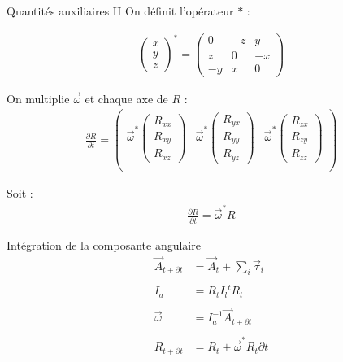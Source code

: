 \documentclass{beamer}
\newcommand{\deriv}{\partial \!}
\begin{document}
\begin{frame}{Quantités auxiliaires II}
  On définit l'opérateur $*$ :

  \begin{align*}
    \begin{pmatrix}
      x \\ y \\ z
    \end{pmatrix}
    ^*
    =
    \begin{pmatrix}
      0 & -z & y \\ z & 0 & -x \\ -y & x & 0
    \end{pmatrix}
  \end{align*}
  
  \vfill

  On multiplie $\vec{\omega}$ et chaque axe de $R$ : 
  \begin{align*}
    \frac{\deriv R}{\deriv t} =
    \begin{pmatrix}
      \vec{\omega}^* \begin{pmatrix} R_{xx} \\ R_{xy} \\ R_{xz} \end{pmatrix} & 
      \vec{\omega}^* \begin{pmatrix} R_{yx} \\ R_{yy} \\ R_{yz} \end{pmatrix} & 
      \vec{\omega}^* \begin{pmatrix} R_{zx} \\ R_{zy} \\ R_{zz} \end{pmatrix} \\
    \end{pmatrix}
  \end{align*}
    
  \vfill

  Soit :
  \begin{align*}
    \frac{\deriv R}{\deriv t} = \vec{\omega}^*R
  \end{align*}  
\end{frame}

\begin{frame}{Intégration de la composante angulaire}
  \begin{align*}
    \vec{A}_{t + \deriv t} &= \vec{A}_t + \sum_i \vec{\tau}_i \\ \\
    I_a &= R_t I_l {}^t\!\!R_t \\ \\
    \vec{\omega} &= I^{-1}_a \vec{A}_{t + \deriv t} \\ \\
    R_{t + \deriv t} &= R_t + \vec{\omega}^* R_t \deriv t
  \end{align*}
\end{frame}
\end{document}
